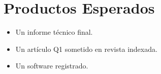 \section{Productos Esperados}

\begin{itemize}
	\item Un informe técnico final.
	\item Un artículo Q1 sometido en revista indexada.
	\item Un software registrado.
\end{itemize}